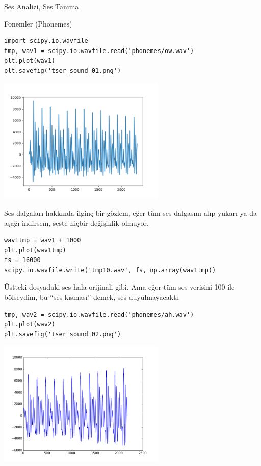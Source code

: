 \documentclass[12pt,fleqn]{article}\usepackage{../../common}
\begin{document}
Ses Analizi, Ses Tanıma

Fonemler (Phonemes)

\begin{verbatim}
import scipy.io.wavfile
tmp, wav1 = scipy.io.wavfile.read('phonemes/ow.wav')
plt.plot(wav1)
plt.savefig('tser_sound_01.png')
\end{verbatim}

\includegraphics[height=6cm]{tser_sound_01.png}

Ses dalgaları hakkında ilginç bir gözlem, eğer tüm ses dalgasını alıp yukarı ya
da aşağı indirsem, seste hiçbir değişiklik olmuyor. 

\begin{verbatim}
wav1tmp = wav1 + 1000
plt.plot(wav1tmp)
fs = 16000 
scipy.io.wavfile.write('tmp10.wav', fs, np.array(wav1tmp))
\end{verbatim}

Üstteki dosyadaki ses hala orijinali gibi. Ama eğer tüm ses verisini 100 ile
bölseydim, bu ``ses kısması'' demek, ses duyulmayacaktı. 

\begin{verbatim}
tmp, wav2 = scipy.io.wavfile.read('phonemes/ah.wav')
plt.plot(wav2)
plt.savefig('tser_sound_02.png')
\end{verbatim}

\includegraphics[height=6cm]{tser_sound_02.png}
\end{document}
